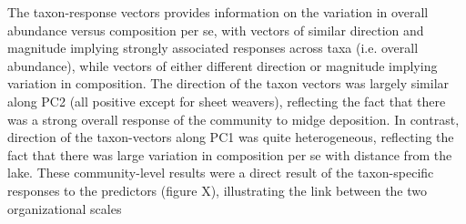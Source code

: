 The taxon-response vectors provides information on the variation in overall
abundance versus composition per se, with vectors of similar direction and magnitude
implying strongly associated responses across taxa (i.e. overall abundance),
while vectors of either different direction or magnitude implying
variation in composition.
The direction of the taxon vectors was largely similar along PC2 (all positive
except for sheet weavers), reflecting the fact that there was a strong overall
response of the community to midge deposition.
In contrast, direction of the taxon-vectors along PC1 was quite heterogeneous,
reflecting the fact that there was large variation in composition per se with
distance from the lake.
These community-level results were a direct result of the taxon-specific responses
to the predictors (figure X),
illustrating the link between the two organizational scales
